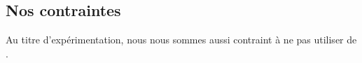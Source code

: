 
\subsection{Nos contraintes}
\label{nomalloc}

Au titre d'expérimentation, nous nous sommes aussi contraint à ne pas utiliser de .
